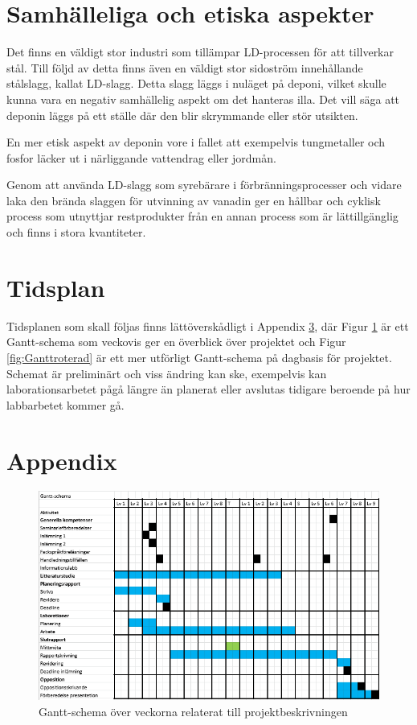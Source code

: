 \documentclass{article}
\begin{document}
\section{Samhälleliga och etiska aspekter}
Det finns en  väldigt stor industri som tillämpar LD-processen för att tillverkar stål. Till följd av detta finns även en väldigt stor sidoström innehållande stålslagg, kallat LD-slagg. Detta slagg läggs i nuläget på deponi, vilket skulle kunna vara en negativ samhällelig aspekt om det hanteras illa. Det vill säga att deponin läggs på ett ställe där den blir skrymmande eller stör utsikten. 

En mer etisk aspekt av deponin vore i fallet att exempelvis tungmetaller och fosfor läcker ut i närliggande vattendrag eller jordmån.

Genom att använda LD-slagg som syrebärare i förbränningsprocesser och vidare laka den brända slaggen för utvinning av vanadin ger en hållbar och cyklisk process som utnyttjar restprodukter från en annan process som är lättillgänglig och finns i stora kvantiteter.

\section{Tidsplan}
Tidsplanen som skall följas finns lättöverskådligt i Appendix \ref{appendix}, där Figur \ref{fig:Ganttliten} är ett Gantt-schema som veckovis ger en överblick över projektet och Figur \ref{fig:Ganttroterad} är ett mer utförligt Gantt-schema på dagbasis för projektet. Schemat är preliminärt och viss ändring kan ske, exempelvis kan laborationsarbetet pågå längre än planerat eller avslutas tidigare beroende på hur labbarbetet kommer gå.

\newpage
\printbibliography
\thispagestyle{empty}
\newpage
\appendix
\section{Appendix} \label{appendix}
\begin{figure}[H]
    \centering
    \includegraphics[scale=0.9]{Ganttliten.PNG}
    \caption{Gantt-schema över veckorna relaterat till projektbeskrivningen}
    \label{fig:Ganttliten}
\end{figure}
\end{document}
